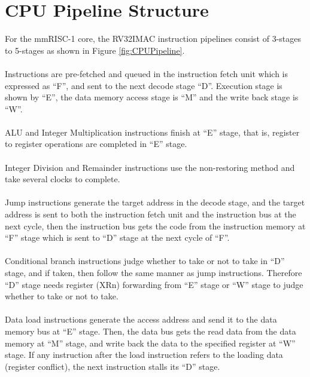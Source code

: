 \section{CPU Pipeline Structure}

For the mmRISC-1 core, the RV32IMAC instruction pipelines consist of 3-stages to 5-stages as shown in Figure \ref{fig:CPUPipeline}.\\\\
Instructions are pre-fetched and queued in the instruction fetch unit which is expressed as “F”, and sent to the next decode stage “D”. Execution stage is shown by “E”, the data memory access stage is “M” and the write back stage is “W”.\\\\

ALU and Integer Multiplication instructions finish at “E” stage, that is, register to register operations are completed in “E” stage.\\\\

Integer Division and Remainder instructions use the non-restoring method and take several clocks to complete.\\\\

Jump instructions generate the target address in the decode stage, and the target address is sent to both the instruction fetch unit and the instruction bus at the next cycle, then the instruction bus gets the code from the instruction memory at “F” stage which is sent to “D” stage at the next cycle of “F”.\\\\

Conditional branch instructions judge whether to take or not to take in “D” stage, and if taken, then follow the same manner as jump instructions. Therefore “D” stage needs register (XRn) forwarding from “E” stage or “W” stage to judge whether to take or not to take.\\\\

Data load instructions generate the access address and send it to the data memory bus at “E” stage. Then, the data bus gets the read data from the data memory at “M” stage, and write back the data to the specified register at “W” stage. If any instruction after the load instruction refers to the loading data (register conflict), the next instruction stalls its “D” stage.\\\\

